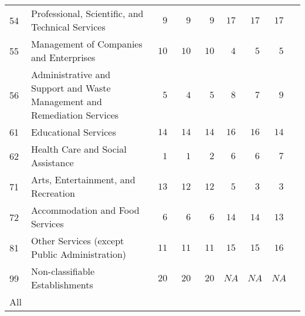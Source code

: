 \documentclass[9pt, oneside]{article}   	%
\begin{document}
\begin{longtable}{lp{3 in}ccccccc}
54  & Professional, Scientific, and Technical Services & $\phantom{00}9$ & $\phantom{00}9$ & $\phantom{00}9$ & $17$ & $17$ & $17$ \\
55  & Management of Companies and Enterprises & $\phantom{0}10$ & $\phantom{0}10$ & $\phantom{0}10$ & $\phantom{0}4$ & $\phantom{0}5$ & $\phantom{0}5$ \\
56  & Administrative and Support and Waste Management and Remediation Services & $\phantom{00}5$ & $\phantom{00}4$ & $\phantom{00}5$ & $\phantom{0}8$ & $\phantom{0}7$ & $\phantom{0}9$ \\
61  & Educational Services & $\phantom{0}14$ & $\phantom{0}14$ & $\phantom{0}14$ & $16$ & $16$ & $14$ \\
62  & Health Care and Social Assistance & $\phantom{00}1$ & $\phantom{00}1$ & $\phantom{00}2$ & $\phantom{0}6$ & $\phantom{0}6$ & $\phantom{0}7$ \\
71  & Arts, Entertainment, and Recreation & $\phantom{0}13$ & $\phantom{0}12$ & $\phantom{0}12$ & $\phantom{0}5$ & $\phantom{0}3$ & $\phantom{0}3$ \\
72  & Accommodation and Food Services & $\phantom{00}6$ & $\phantom{00}6$ & $\phantom{00}6$ & $14$ & $14$ & $13$ \\
81  & Other Services (except Public Administration) & $\phantom{0}11$ & $\phantom{0}11$ & $\phantom{0}11$ & $15$ & $15$ & $16$ \\
99  & Non-classifiable Establishments & $\phantom{0}20$ & $\phantom{0}20$ & $\phantom{0}20$ & $NA$ & $NA$ & $NA$ \\
\cline{1-1} \cline{2-2} \cline{3-3} \cline{4-4} \cline{5-5} \cline{6-6} \cline{7-7} \cline{8-8} \cline{9-9} %
All  &  &  &  &  &  & &  \\
\hline 
\end{longtable}

      
 \pagebreak     
 
      
      

      
\end{document}
